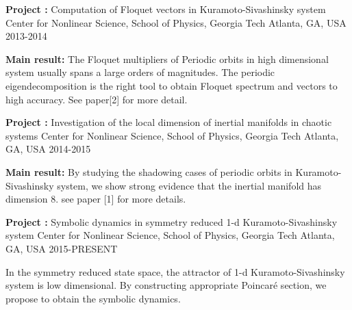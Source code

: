 


\begin{cventries}


\cventry
{\textbf{Project :} Computation of Floquet vectors in Kuramoto-Sivashinsky system} 
{Center for Nonlinear Science, School of Physics, Georgia Tech} 
{Atlanta, GA, USA} %
{2013-2014} %
{
  \begin{cvitems}
    \item {\textbf{Main result:} The Floquet multipliers of Periodic orbits in high dimensional system 
        usually spans a large orders of magnitudes. The periodic eigendecomposition is the right tool
        to obtain Floquet spectrum and vectors to high accuracy. See paper[2] for more detail.
      }
  \end{cvitems}
}

\cventry
{\textbf{Project :} Investigation of the local dimension of inertial manifolds in chaotic systems} 
{Center for Nonlinear Science, School of Physics, Georgia Tech} 
{Atlanta, GA, USA} %
{2014-2015} %
{
  \begin{cvitems}
    \item {\textbf{Main result:} By studying the shadowing cases of periodic orbits in
        Kuramoto-Sivashinsky system, we show strong evidence that the inertial manifold has
        dimension 8. see paper [1] for more details.}
  \end{cvitems}
}

\cventry
{\textbf{Project :} Symbolic dynamics in symmetry reduced 1-d Kuramoto-Sivashinsky system} 
{Center for Nonlinear Science, School of Physics, Georgia Tech} 
{Atlanta, GA, USA} %
{2015-PRESENT} %
{
  \begin{cvitems}
      \item {In the symmetry reduced state space, the attractor of  1-d Kuramoto-Sivashinsky system
          is low dimensional. By constructing appropriate Poincar\'e section, we propose to obtain the
          symbolic dynamics. }
  \end{cvitems}
}


\end{cventries}

